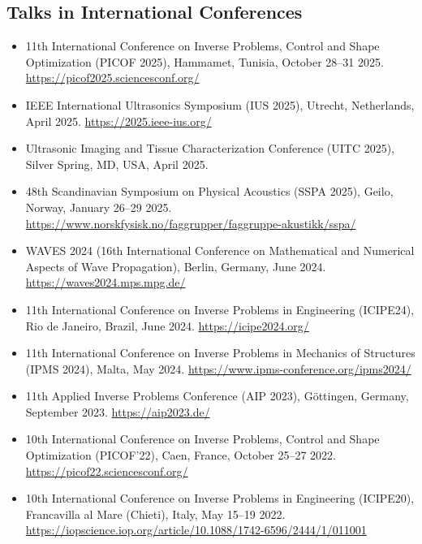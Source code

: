 \documentclass[10pt]{article}
\begin{document}
\subsection{Talks in International Conferences}
\begin{itemize}
\item 11th International Conference on Inverse Problems, Control and Shape Optimization (PICOF 2025), Hammamet, Tunisia, October 28--31 2025. \url{https://picof2025.sciencesconf.org/}
\item IEEE International Ultrasonics Symposium (IUS 2025), Utrecht, Netherlands, April 2025. \url{https://2025.ieee-ius.org/}
\item Ultrasonic Imaging and Tissue Characterization Conference (UITC 2025), Silver Spring, MD, USA, April 2025.
\item 48th Scandinavian Symposium on Physical Acoustics (SSPA 2025), Geilo, Norway, January 26--29 2025. \url{https://www.norskfysisk.no/faggrupper/faggruppe-akustikk/sspa/}
\item WAVES 2024 (16th International Conference on Mathematical and Numerical Aspects of Wave Propagation), Berlin, Germany, June 2024. \url{https://waves2024.mps.mpg.de/}
\item 11th International Conference on Inverse Problems in Engineering (ICIPE24), Rio de Janeiro, Brazil, June 2024. \url{https://icipe2024.org/}
\item 11th International Conference on Inverse Problems in Mechanics of Structures (IPMS 2024), Malta, May 2024. \url{https://www.ipms-conference.org/ipms2024/}
\item 11th Applied Inverse Problems Conference (AIP 2023), Göttingen, Germany, September 2023. \url{https://aip2023.de/}
\item 10th International Conference on Inverse Problems, Control and Shape Optimization (PICOF'22), Caen, France, October 25--27 2022. \url{https://picof22.sciencesconf.org/}
\item 10th International Conference on Inverse Problems in Engineering (ICIPE20), Francavilla al Mare (Chieti), Italy, May 15--19 2022. \url{https://iopscience.iop.org/article/10.1088/1742-6596/2444/1/011001}
\end{itemize}
\end{document}
